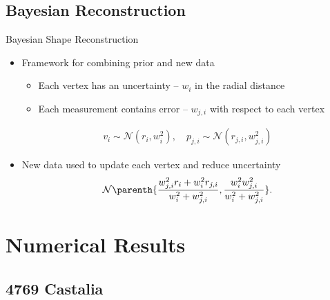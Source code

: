 \documentclass[11pt,professionalfonts,aspectratio=169]{beamer}
\begin{document}
\subsection[Reconstruction]{Bayesian Reconstruction}
\begin{frame}{Bayesian Shape Reconstruction}
    \begin{itemize}
        \item<1-> Framework for combining prior and new data 
            \begin{itemize}
                \item Each vertex has an uncertainty -- \( w_i\) in the radial distance
                \item Each measurement contains error -- \( w_{j, i} \) with respect to each vertex
            \end{itemize}
            \begin{align*}
                v_i \sim \mathcal{N}(r_i, w_i^2) , \quad
                p_{j,i} \sim \mathcal{N}(r_{j,i}, w_{j,i}^2)
            \end{align*}
        \item<2-> New data used to update each vertex and reduce uncertainty
    \begin{align*}\label{eq:posterior_probability}
        \mathcal{N} \parenth{\frac{w_{j, i}^2 r_i + w_i^2 r_{j, i}}{w_i^2 + w_{j, i}^2} , \frac{w_i^2  w_{j, i}^2}{w_i^2 +  w_{j, i}^2}} .
    \end{align*}
    \end{itemize}
\end{frame}

\section[Results]{Numerical Results}

\subsection[4769 Castalia]{4769 Castalia}
\end{document}
